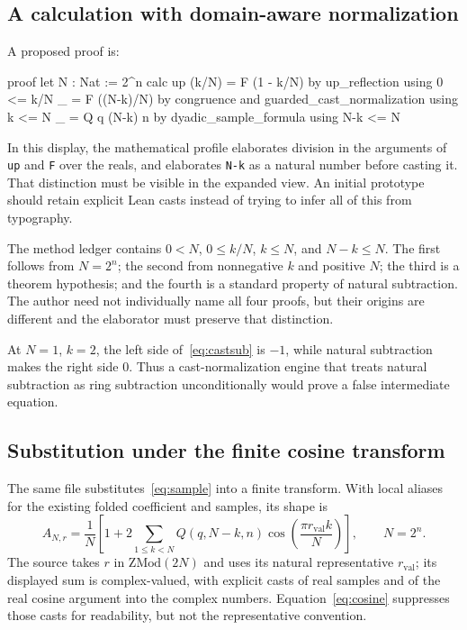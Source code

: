 \documentclass[11pt,a4paper]{article}
\theoremstyle{remark}
\newcommand{\ty}[1]{\texttt{#1}}
\begin{document}
\subsection{A calculation with domain-aware normalization}
A proposed proof is:
\Needspace{130pt}
\begin{code}
proof
  let N : Nat := 2^n
  calc
    up (k/N) = F (1 - k/N)
      by up_reflection using 0 <= k/N
    _ = F ((N-k)/N)
      by congruence and guarded_cast_normalization using k <= N
    _ = Q q (N-k) n
      by dyadic_sample_formula using N-k <= N
\end{code}
In this display, the mathematical profile elaborates division in the arguments of \ty{up} and \ty{F} over the reals, and elaborates \ty{N-k} as a natural number before casting it. That distinction must be visible in the expanded view. An initial prototype should retain explicit Lean casts instead of trying to infer all of this from typography.

The method ledger contains $0<N$, $0\leq k/N$, $k\leq N$, and $N-k\leq N$. The first follows from $N=2^n$; the second from nonnegative $k$ and positive $N$; the third is a theorem hypothesis; and the fourth is a standard property of natural subtraction. The author need not individually name all four proofs, but their origins are different and the elaborator must preserve that distinction.

At $N=1$, $k=2$, the left side of~\eqref{eq:castsub} is $-1$, while natural subtraction makes the right side $0$. Thus a cast-normalization engine that treats natural subtraction as ring subtraction unconditionally would prove a false intermediate equation.

\subsection{Substitution under the finite cosine transform}
The same file substitutes~\eqref{eq:sample} into a finite transform. With local aliases for the existing folded coefficient and samples, its shape is
\begin{equation}\label{eq:cosine}
 A_{N,r}=\frac1N\left[1+2\sum_{1\leq k<N}
 Q(q,N-k,n)\cos\left(\frac{\pi r_{\mathrm{val}}k}{N}\right)\right],
 \qquad N=2^n.
\end{equation}
The source takes $r$ in $\mathrm{ZMod}(2N)$ and uses its natural representative $r_{\mathrm{val}}$; its displayed sum is complex-valued, with explicit casts of real samples and of the real cosine argument into the complex numbers. Equation~\eqref{eq:cosine} suppresses those casts for readability, but not the representative convention.\cite{proveit-alias}
\end{document}
